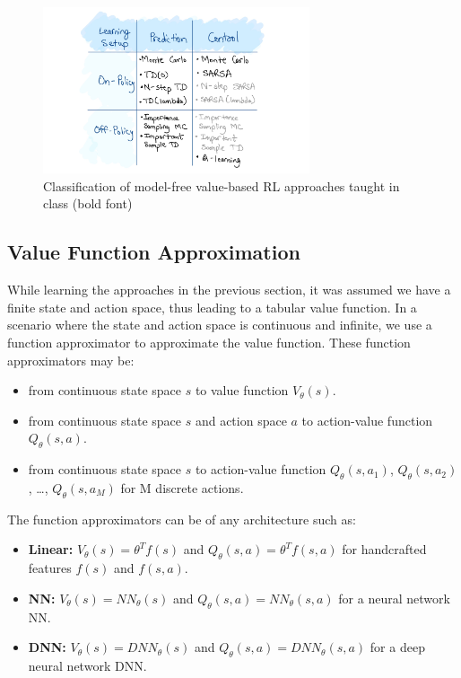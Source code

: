 \documentclass[11pt]{article}
\begin{document}
\begin{figure}[H]
    \centering
    \includegraphics[width=0.7\textwidth]{model_free_classes.jpg}
    \caption{Classification of model-free value-based RL approaches taught in class (bold font)}
    \label{fig:model-free}
\end{figure}

\subsection{Value Function Approximation}

While learning the approaches in the previous section, it was assumed we have a finite state and action space, thus leading to a tabular value function. In a scenario where the state and action space is continuous and infinite, we use a function approximator to approximate the value function. These function approximators may be:

\begin{itemize}
    \item from continuous state space $s$ to value function $V_{\theta}(s)$.
    \item from continuous state space $s$ and action space $a$ to action-value function $Q_{\theta}(s,a)$. 
    \item from continuous state space $s$ to action-value function $Q_{\theta}(s,a_1)$, $Q_{\theta}(s,a_2)$, \ldots, $Q_{\theta}(s,a_M)$ for M discrete actions.

\end{itemize}

The function approximators can be of any architecture such as:

\begin{itemize}
    \item \textbf{Linear:} $V_{\theta}(s) = \theta^Tf(s)$ and $Q_{\theta}(s,a) = \theta^Tf(s,a)$ for handcrafted features $f(s)$ and $f(s,a)$.
    \item \textbf{NN:} $V_{\theta}(s) = NN_{\theta}(s)$ and $Q_{\theta}(s,a) = NN_{\theta}(s,a)$ for a neural network NN.
    \item \textbf{DNN:} $V_{\theta}(s) = DNN_{\theta}(s)$ and $Q_{\theta}(s,a) = DNN_{\theta}(s,a)$ for a deep neural network DNN.
\end{itemize}
\end{document}
